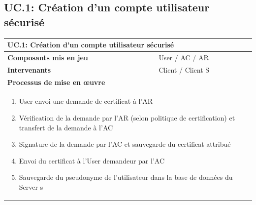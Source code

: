\documentclass[a4paper,11pt,french]{article}
\begin{document}
\subsection{UC.1: Création d'un compte utilisateur sécurisé}
\begin{center}
	\vspace*{0.7cm}
	\begin{tabularx}{16cm}{|l|X|}
	\hline
	\multicolumn{2}{|l|}{\textbf{UC.1: Création d'un compte utilisateur sécurisé}}\\
	\hline
	\textbf{Composants mis en jeu} & User / AC / AR\\
	\hline
	\textbf{Intervenants} & Client / Client S\\
	\hline
	\multicolumn{2}{|l|}{\textbf{Processus de mise en \oe uvre}}\\
	\hline
	\multicolumn{2}{|p{15cm}|}{\begin{enumerate}\item User envoi une demande de certificat à l'AR \item Vérification de la demande par l'AR (selon politique de certification) et transfert de la demande à l'AC \item Signature de la demande par l'AC et sauvegarde du certificat attribué \item Envoi du certificat à l'User demandeur par l'AC \item Sauvegarde du pseudonyme de l'utilisateur dans la base de données du Server s \end{enumerate}}\\
	\hline
	\end{tabularx}
\end{center}
\vspace{2cm}
\end{document}
